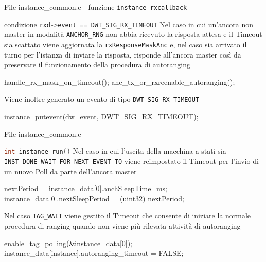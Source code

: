\begin{frame}[fragile]{File instance\_common.c - funzione \lstinline[language=C]!instance_rxcallback!}
  \begin{block}{condizione \lstinline[language=C]!rxd->event == DWT_SIG_RX_TIMEOUT!}
    Nel caso in cui un'ancora \alert{non master} in modalità \lstinline[language=C]!ANCHOR_RNG! non abbia ricevuto la risposta attesa e il Timeout sia scattato viene
    aggiornata la \lstinline[language=C]!rxResponseMaskAnc! e, nel caso sia arrivato il turno per l'istanza di inviare la risposta, risponde all'ancora master così da preservare il funzionamento della procedura di autoranging
    \begin{C}
      handle_rx_mask_on_timeout();
      anc_tx_or_rxreenable_autoranging();
    \end{C}
    Viene inoltre generato un evento di tipo \lstinline[language=C]!DWT_SIG_RX_TIMEOUT!
    \begin{C}
      instance_putevent(dw_event, DWT_SIG_RX_TIMEOUT);
    \end{C}
  \end{block}
\end{frame}

\begin{frame}[fragile]{File instance\_common.c}
  \begin{block}{\lstinline[language=C]!int instance_run()! \newfunction}
    Nel caso in cui l'uscita della macchina a stati sia \lstinline[language=C]!INST_DONE_WAIT_FOR_NEXT_EVENT_TO! viene reimpostato il Timeout per l'invio di un nuovo Poll
    da parte dell'ancora \alert{master}
    \begin{C}
      nextPeriod = instance_data[0].anchSleepTime_ms;
      instance_data[0].nextSleepPeriod = (uint32) nextPeriod;
    \end{C}
    Nel caso \lstinline[language=C]!TAG_WAIT! viene gestito il Timeout che consente di iniziare la normale procedura di ranging quando
    non viene più rilevata attività di autoranging
    \begin{C}
      enable_tag_polling(&instance_data[0]);
      instance_data[instance].autoranging_timeout = FALSE;
    \end{C}
  \end{block}
\end{frame}


    
